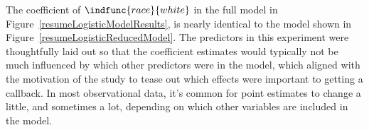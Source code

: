

The coefficient of $\indfunc{race}{white}$ in the full model in
Figure~\ref{resumeLogisticModelResults},
is nearly identical to the model shown in
Figure~\ref{resumeLogisticReducedModel}.
The predictors in this experiment were thoughtfully
laid out so that the coefficient estimates would typically
not be much influenced by which other predictors were 
in the model,
which aligned with the motivation of the study to tease
out which effects were important to getting a callback.
In most observational data,
it's common for point estimates to change a little,
and sometimes a lot, depending on which other
variables are included in the model.


